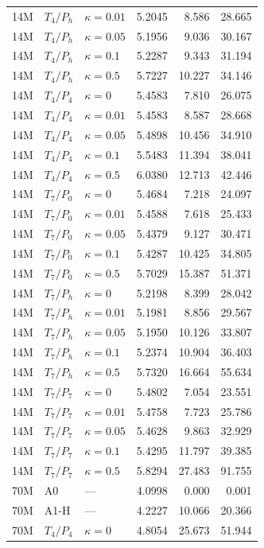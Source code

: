{\begin{longtable}{@{}lllrrr@{}}
14M & $T_4/P_h$ & $\kappa=0.01$ & 5.2045 & 8.586 & 28.665 \\
14M & $T_4/P_h$ & $\kappa=0.05$ & 5.1956 & 9.036 & 30.167 \\
14M & $T_4/P_h$ & $\kappa=0.1$ & 5.2287 & 9.343 & 31.194 \\
14M & $T_4/P_h$ & $\kappa=0.5$ & 5.7227 & 10.227 & 34.146 \\
14M & $T_4/P_4$ & $\kappa=0$ & 5.4583 & 7.810 & 26.075 \\
14M & $T_4/P_4$ & $\kappa=0.01$ & 5.4583 & 8.587 & 28.668 \\
14M & $T_4/P_4$ & $\kappa=0.05$ & 5.4898 & 10.456 & 34.910 \\
14M & $T_4/P_4$ & $\kappa=0.1$ & 5.5483 & 11.394 & 38.041 \\
14M & $T_4/P_4$ & $\kappa=0.5$ & 6.0380 & 12.713 & 42.446 \\
14M & $T_7/P_0$ & $\kappa=0$ & 5.4684 & 7.218 & 24.097 \\
14M & $T_7/P_0$ & $\kappa=0.01$ & 5.4588 & 7.618 & 25.433 \\
14M & $T_7/P_0$ & $\kappa=0.05$ & 5.4379 & 9.127 & 30.471 \\
14M & $T_7/P_0$ & $\kappa=0.1$ & 5.4287 & 10.425 & 34.805 \\
14M & $T_7/P_0$ & $\kappa=0.5$ & 5.7029 & 15.387 & 51.371 \\
14M & $T_7/P_h$ & $\kappa=0$ & 5.2198 & 8.399 & 28.042 \\
14M & $T_7/P_h$ & $\kappa=0.01$ & 5.1981 & 8.856 & 29.567 \\
14M & $T_7/P_h$ & $\kappa=0.05$ & 5.1950 & 10.126 & 33.807 \\
14M & $T_7/P_h$ & $\kappa=0.1$ & 5.2374 & 10.904 & 36.403 \\
14M & $T_7/P_h$ & $\kappa=0.5$ & 5.7320 & 16.664 & 55.634 \\
14M & $T_7/P_7$ & $\kappa=0$ & 5.4802 & 7.054 & 23.551 \\
14M & $T_7/P_7$ & $\kappa=0.01$ & 5.4758 & 7.723 & 25.786 \\
14M & $T_7/P_7$ & $\kappa=0.05$ & 5.4628 & 9.863 & 32.929 \\
14M & $T_7/P_7$ & $\kappa=0.1$ & 5.4295 & 11.797 & 39.385 \\
14M & $T_7/P_7$ & $\kappa=0.5$ & 5.8294 & 27.483 & 91.755 \\
70M & A0 & --- & 4.0998 & 0.000 & 0.001 \\
70M & A1-H & --- & 4.2227 & 10.066 & 20.366 \\
70M & $T_4/P_4$ & $\kappa=0$ & 4.8054 & 25.673 & 51.944 \\

\end{longtable}}
